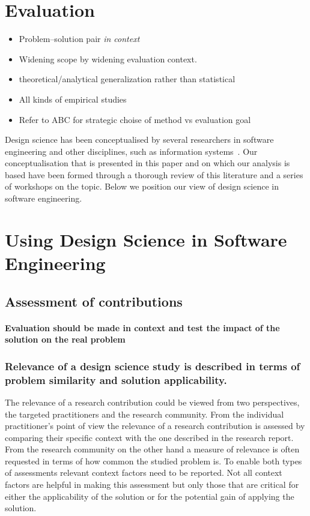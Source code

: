 \documentclass[graybox]{svmult}
\begin{document}
\section{Evaluation}
\begin{itemize}
\item Problem--solution pair \emph{in context}
\item Widening scope by widening evaluation context. 
\item theoretical/analytical generalization rather than statistical 
\item All kinds of empirical studies \cite{easterbrook_selecting_2008}\cite{Runeson12Case,WohlinExpBook12}
\item Refer to ABC \cite{StolABC18} for strategic choise of method vs evaluation goal
\end{itemize}



Design science has been conceptualised by several researchers in software engineering and other disciplines, such as information systems~\cite{gregor_positioning_2013}. Our conceptualisation that is presented in this paper and on which our analysis is based have been formed through a thorough review of this literature and a series of workshops on the topic. Below we position our view of design science in software engineering.



\section{Using Design Science in Software Engineering}
\subsection{Assessment of contributions}
\paragraph{Evaluation should be made in context and test the impact of the solution on the real problem}

\subsubsection{Relevance of a design science study is described in terms of problem similarity and solution applicability.} The relevance of a research contribution could be viewed from two perspectives, the targeted practitioners and the research community. From the individual practitioner's point of view the relevance of a research contribution is assessed by comparing their specific context with the one described in the research report. From the research community on the other hand a measure of relevance is often requested in terms of how common the studied problem is. To enable both types of assessments relevant context factors need to be reported. Not all context factors are helpful in making this assessment but only those that are critical for either the applicability of the solution or for the potential gain of applying the solution. 
\end{document}

